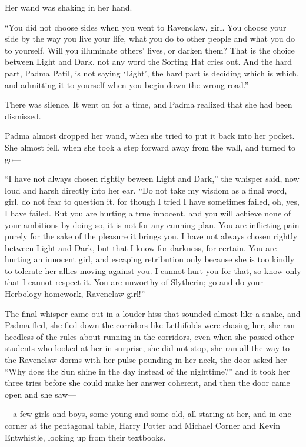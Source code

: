 Her wand was shaking in her hand.

“You did not choose sides when you went to Ravenclaw, girl. You choose your side by the way you live your life, what you do to other people and what you do to yourself. Will you illuminate others’ lives, or darken them? That is the choice between Light and Dark, not any word the Sorting Hat cries out. And the hard part, Padma Patil, is not saying ‘Light’, the hard part is deciding which is which, and admitting it to yourself when you begin down the wrong road.”

There was silence. It went on for a time, and Padma realized that she had been dismissed.

Padma almost dropped her wand, when she tried to put it back into her pocket. She almost fell, when she took a step forward away from the wall, and turned to go—

“I have not always chosen rightly beween Light and Dark,” the whisper said, now loud and harsh directly into her ear. “Do not take my wisdom as a final word, girl, do not fear to question it, for though I tried I have sometimes failed, oh, yes, I have failed. But you are hurting a true innocent, and you will achieve none of your ambitions by doing so, it is not for any cunning plan. You are inflicting pain purely for the sake of the pleasure it brings you. I have not always chosen rightly between Light and Dark, but that I know for darkness, for certain. You are hurting an innocent girl, and escaping retribution only because she is too kindly to tolerate her allies moving against you. I cannot hurt you for that, so know only that I cannot respect it. You are unworthy of Slytherin; go and do your Herbology homework, Ravenclaw girl!”

The final whisper came out in a louder hiss that sounded almost like a snake, and Padma fled, she fled down the corridors like Lethifolds were chasing her, she ran heedless of the rules about running in the corridors, even when she passed other students who looked at her in surprise, she did not stop, she ran all the way to the Ravenclaw dorms with her pulse pounding in her neck, the door asked her “Why does the Sun shine in the day instead of the nighttime?” and it took her three tries before she could make her answer coherent, and then the door came open and she saw—

—a few girls and boys, some young and some old, all staring at her, and in one corner at the pentagonal table, Harry Potter and Michael Corner and Kevin Entwhistle, looking up from their textbooks.

